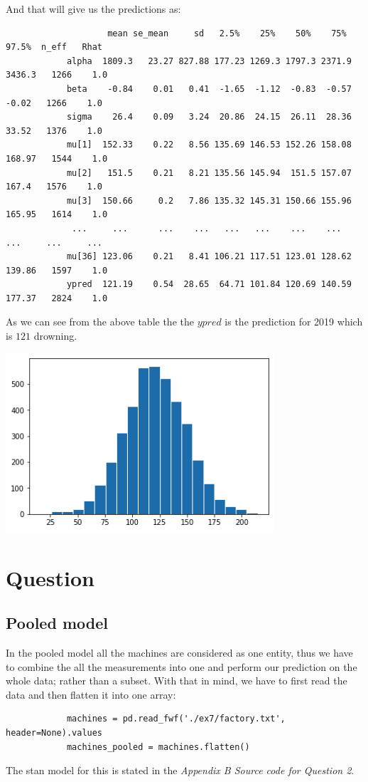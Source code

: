 \documentclass[11pt,a4paper,english]{article}
\begin{document}
          And that will give us the predictions as:
          \begin{verbatim}
                    mean se_mean     sd   2.5%    25%    50%    75%  97.5%  n_eff   Rhat
            alpha  1809.3   23.27 827.88 177.23 1269.3 1797.3 2371.9 3436.3   1266    1.0
            beta    -0.84    0.01   0.41  -1.65  -1.12  -0.83  -0.57  -0.02   1266    1.0
            sigma    26.4    0.09   3.24  20.86  24.15  26.11  28.36  33.52   1376    1.0
            mu[1]  152.33    0.22   8.56 135.69 146.53 152.26 158.08 168.97   1544    1.0
            mu[2]   151.5    0.21   8.21 135.56 145.94  151.5 157.07  167.4   1576    1.0
            mu[3]  150.66     0.2   7.86 135.32 145.31 150.66 155.96 165.95   1614    1.0
             ...     ...      ...    ...   ...   ...    ...    ...    ...     ...     ...
            mu[36] 123.06    0.21   8.41 106.21 117.51 123.01 128.62 139.86   1597    1.0
            ypred  121.19    0.54  28.65  64.71 101.84 120.69 140.59 177.37   2824    1.0
          \end{verbatim}
          As we can see from the above table the the $ypred$ is the prediction for 2019 which is $121$ drowning.
          \begin{center}
            \includegraphics[width=10cm]{drowning_y_prediction.png}
          \end{center}

      \section{Question}
        \subsection{Pooled model}
          In the pooled model all the machines are considered as one entity, thus we have to combine the all the measurements into one and perform our prediction on the whole data; rather than a subset. With that in mind, we have to first read the data and then flatten it into one array:
          \begin{verbatim}
            machines = pd.read_fwf('./ex7/factory.txt', header=None).values
            machines_pooled = machines.flatten()
          \end{verbatim}
          The stan model for this is stated in the \textit{Appendix B  Source code for Question 2}.
\end{document}
